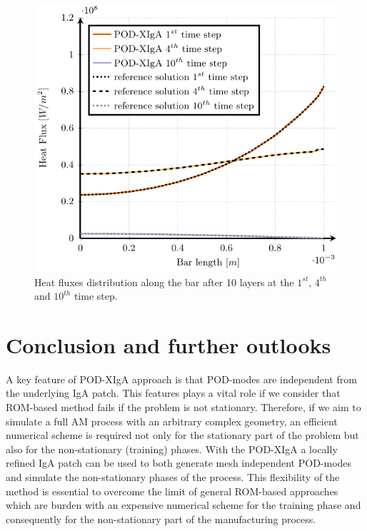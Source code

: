 \documentclass[3p]{article}
\begin{document}
\begin{figure}[!h]
\centering

\includegraphics[width=0.75\linewidth]{externals/pgfplots/LastLayerFluxesComparisonMultiscale.pdf}

    \caption{Heat fluxes distribution along the bar after 10 layers at the $1^{st}$, $4^{th}$ and $10^{th}$ time step.}
    \label{HeatFluxes}
\end{figure}


\section*{Conclusion and further outlooks}


A key feature of POD-XIgA approach is that POD-modes are independent from the underlying IgA patch. This features plays a vital role if we consider that ROM-based method fails if the problem is not stationary. Therefore, if we aim to simulate a full AM process with an arbitrary complex geometry, an efficient numerical scheme is required not only for the stationary part of the problem but also for the non-stationary (training) phases. With the POD-XIgA a locally refined IgA patch can be used to both generate mesh independent POD-modes and simulate the non-stationary phases of the process. This flexibility of the method is essential to overcome the limit of general ROM-based approaches which are burden with an expensive numerical scheme for the training phase and consequently for the non-stationary part of the manufacturing process.
\end{document}

